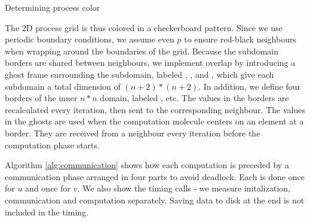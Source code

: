 \documentclass[a4paper,11pt]{article}
\begin{document}
\vspace{0.7 cm}
\begin{algorithm}[H]
\label{alg:processcolor}
  \SetAlgoLined
  \caption{Determining process color}
\end{algorithm}
\vspace{0.7 cm}

The 2D process grid is thus colored in a checkerboard pattern. Since we use periodic boundary conditions, we assume even $p$ to ensure red-black neighbours when wrapping around the boundaries of the grid. Because the subdomain borders are shared between neighbours, we implement overlap by introducing a ghost frame surrounding the subdomain, labeled , ,  and , which give each subdomain a total dimension of $(n+2)*(n+2)$. In addition, we define four borders of the inner $n*n$ domain, labeled ,  etc. The values in the borders are recalculated every iteration, then sent to the corresponding neighbour. The values in the ghosts are used when the computation molecule centers on an element at a border. They are received from a neighbour every iteration before the computation phase starts.

Algorithm \ref{alg:communication} shows how each computation is preceded by a communication phase arranged in four parts to avoid deadlock. Each  is done once for $u$ and once for $v$. We also show the timing calls - we measure initalization, communication and computation separately. Saving data to disk at the end is not included in the timing.
\end{document}
